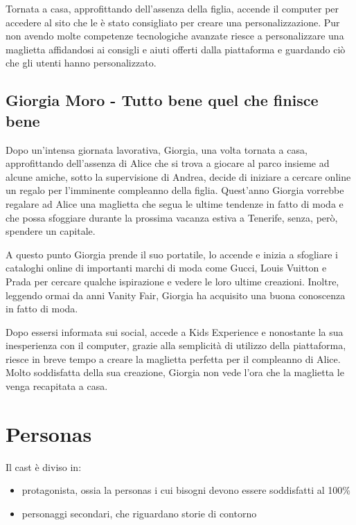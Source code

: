\documentclass[12pt,italian,]{report}
\providecommand{\tightlist}{%
  \setlength{\itemsep}{0pt}\setlength{\parskip}{0pt}}
\begin{document}
Tornata a casa, approfittando dell'assenza della figlia, accende il
computer per accedere al sito che le è stato consigliato per creare una
personalizzazione. Pur non avendo molte competenze tecnologiche avanzate
riesce a personalizzare una maglietta affidandosi ai consigli e aiuti
offerti dalla piattaforma e guardando ciò che gli utenti hanno
personalizzato.

\hypertarget{giorgia-moro---tutto-bene-quel-che-finisce-bene}{%
\subsection{Giorgia Moro - Tutto bene quel che finisce
bene}\label{giorgia-moro---tutto-bene-quel-che-finisce-bene}}

Dopo un'intensa giornata lavorativa, Giorgia, una volta tornata a casa,
approfittando dell'assenza di Alice che si trova a giocare al parco
insieme ad alcune amiche, sotto la supervisione di Andrea, decide di
iniziare a cercare online un regalo per l'imminente compleanno della
figlia. Quest'anno Giorgia vorrebbe regalare ad Alice una maglietta che
segua le ultime tendenze in fatto di moda e che possa sfoggiare durante
la prossima vacanza estiva a Tenerife, senza, però, spendere un
capitale.

A questo punto Giorgia prende il suo portatile, lo accende e inizia a
sfogliare i cataloghi online di importanti marchi di moda come Gucci,
Louis Vuitton e Prada per cercare qualche ispirazione e vedere le loro
ultime creazioni. Inoltre, leggendo ormai da anni Vanity Fair, Giorgia
ha acquisito una buona conoscenza in fatto di moda.

Dopo essersi informata sui social, accede a Kids Experience e nonostante
la sua inesperienza con il computer, grazie alla semplicità di utilizzo
della piattaforma, riesce in breve tempo a creare la maglietta perfetta
per il compleanno di Alice. Molto soddisfatta della sua creazione,
Giorgia non vede l'ora che la maglietta le venga recapitata a casa.
\newpage
\hypertarget{personas}{%
\section{Personas}\label{personas}}

Il cast è diviso in:

\begin{itemize}
\tightlist
\item
  protagonista, ossia la personas i cui bisogni devono essere soddisfatti
  al 100\%
\item
  personaggi secondari, che riguardano storie di contorno
\end{itemize}
\end{document}
